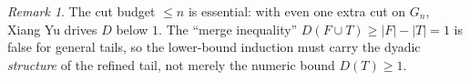 \documentclass[11pt]{article}
\theoremstyle{remark}\newtheorem*{remark}{Remark}
\newcommand{\Gn}{G_{n}}
\begin{document}
\begin{remark}
The cut budget $\le n$ is essential: with even one extra cut on $\Gn$, Xiang Yu
drives $D$ below $1$. The ``merge inequality'' $D(F\cup T)\ge|F|-|T|=1$ is false for
general tails, so the lower-bound induction must carry the dyadic \emph{structure}
of the refined tail, not merely the numeric bound $D(T)\ge1$.
\end{remark}
\end{document}

